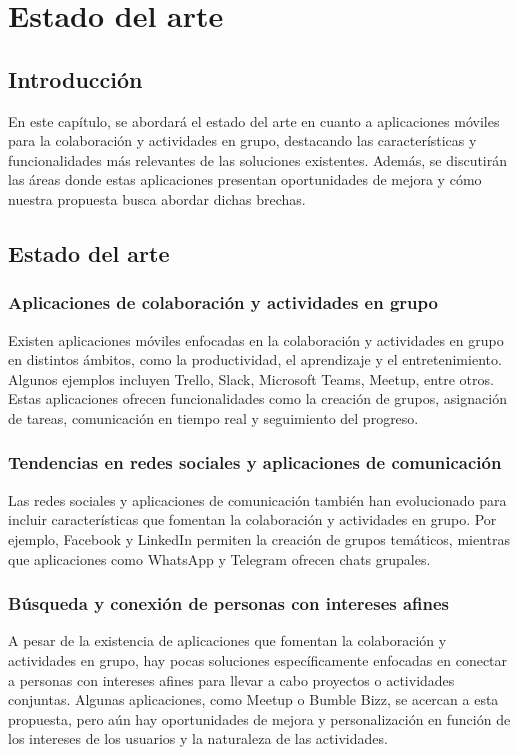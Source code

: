 \chapter{Estado del arte}
\section{Introducción}
En este capítulo, se abordará el estado del arte en
cuanto a aplicaciones móviles para la colaboración y
actividades en grupo, destacando las características y
funcionalidades más relevantes de las soluciones existentes.
Además, se discutirán las áreas donde estas aplicaciones
presentan oportunidades de mejora y cómo nuestra propuesta
busca abordar dichas brechas.

\section{Estado del arte}
\subsection{Aplicaciones de colaboración y actividades en grupo}
Existen aplicaciones móviles enfocadas en la colaboración y actividades en grupo en distintos ámbitos, como la productividad, el aprendizaje y el entretenimiento. Algunos ejemplos incluyen Trello, Slack, Microsoft Teams, Meetup, entre otros. Estas aplicaciones ofrecen funcionalidades como la creación de grupos, asignación de tareas, comunicación en tiempo real y seguimiento del progreso.

\subsection{Tendencias en redes sociales y aplicaciones de comunicación}
Las redes sociales y aplicaciones de comunicación también han evolucionado para incluir características que fomentan la colaboración y actividades en grupo. Por ejemplo, Facebook y LinkedIn permiten la creación de grupos temáticos, mientras que aplicaciones como WhatsApp y Telegram ofrecen chats grupales.

\subsection{Búsqueda y conexión de personas con intereses afines}
A pesar de la existencia de aplicaciones que fomentan la colaboración y actividades en grupo, hay pocas soluciones específicamente enfocadas en conectar a personas con intereses afines para llevar a cabo proyectos o actividades conjuntas. Algunas aplicaciones, como Meetup o Bumble Bizz, se acercan a esta propuesta, pero aún hay oportunidades de mejora y personalización en función de los intereses de los usuarios y la naturaleza de las actividades.

